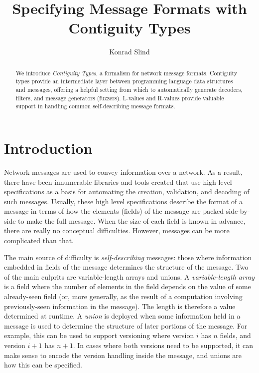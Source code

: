\documentclass[svgnames]{llncs}
\begin{document}
\title{Specifying Message Formats with \\ Contiguity Types}

\author{Konrad Slind}
\maketitle

\begin{abstract}
We introduce \emph{Contiguity Types}, a formalism for network message
formats. Contiguity types provide an intermediate layer between
programming language data structures and messages, offering a helpful
setting from which to automatically generate decoders, filters, and
message generators (fuzzers). L-values and R-values provide valuable
support in handling common self-describing message formats.
\end{abstract}



\section{Introduction}\label{sec:intro}

Network messages are used to convey information over a network. As a
result, there have been innumerable libraries and tools created that
use high level specifications as a basis for automating the creation,
validation, and decoding of such messages. Usually, these high level
specifications describe the format of a message in terms of how the
elements (fields) of the message are packed side-by-side to make the
full message. When the size of each field is known in advance, there
are really no conceptual difficulties. However, messages can be more
complicated than that.

The main source of difficulty is \emph{self-describing} messages:
those where information embedded in fields of the message determines
the structure of the message. Two of the main culprits are
variable-length arrays and unions. A \emph{variable-length array} is a
field where the number of elements in the field depends on the value
of some already-seen field (or, more generally, as the result of a
computation involving previously-seen information in the message).
The length is therefore a value determined at runtime. A \emph{union}
is deployed when some information held in a message is used to
determine the structure of later portions of the message. For example,
this can be used to support versioning where version $i$ has $n$
fields, and version $i+1$ has $n+1$. In cases where both versions need
to be supported, it can make sense to encode the version handling
inside the message, and unions are how this can be specified.
\end{document}
